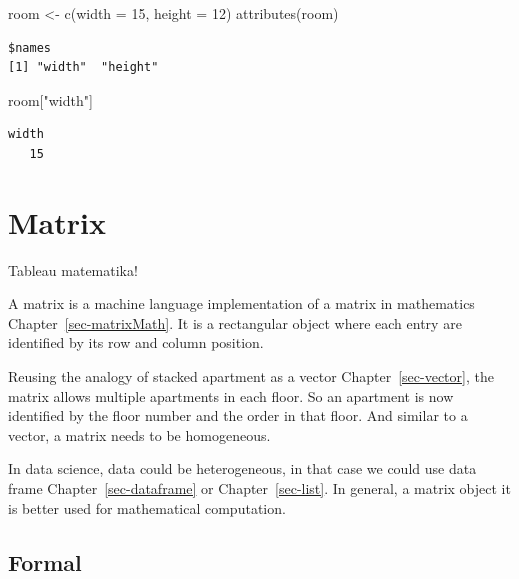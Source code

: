 \documentclass[
  letterpaper,
  DIV=11,
  numbers=noendperiod]{scrreprt}
\newenvironment{Shaded}{\begin{snugshade}}{\end{snugshade}}
\newcommand{\AttributeTok}[1]{\textcolor[rgb]{0.40,0.45,0.13}{#1}}
\newcommand{\DecValTok}[1]{\textcolor[rgb]{0.68,0.00,0.00}{#1}}
\newcommand{\FunctionTok}[1]{\textcolor[rgb]{0.28,0.35,0.67}{#1}}
\newcommand{\NormalTok}[1]{\textcolor[rgb]{0.00,0.23,0.31}{#1}}
\newcommand{\OtherTok}[1]{\textcolor[rgb]{0.00,0.23,0.31}{#1}}
\newcommand{\StringTok}[1]{\textcolor[rgb]{0.13,0.47,0.30}{#1}}
\begin{document}
\begin{Shaded}
\begin{Highlighting}[]
\NormalTok{room }\OtherTok{\textless{}{-}} \FunctionTok{c}\NormalTok{(}\AttributeTok{width =} \DecValTok{15}\NormalTok{, }\AttributeTok{height =} \DecValTok{12}\NormalTok{)}
\FunctionTok{attributes}\NormalTok{(room)}
\end{Highlighting}
\end{Shaded}

\begin{verbatim}
$names
[1] "width"  "height"
\end{verbatim}

\begin{Shaded}
\begin{Highlighting}[]
\NormalTok{room[}\StringTok{"width"}\NormalTok{]}
\end{Highlighting}
\end{Shaded}

\begin{verbatim}
width 
   15 
\end{verbatim}

\chapter{Matrix}\label{sec-matrixCoding}

Tableau matematika!

A matrix is a machine language implementation of a matrix in mathematics
Chapter~\ref{sec-matrixMath}. It is a rectangular object where each
entry are identified by its row and column position.

Reusing the analogy of stacked apartment as a vector
Chapter~\ref{sec-vector}, the matrix allows multiple apartments in each
floor. So an apartment is now identified by the floor number and the
order in that floor. And similar to a vector, a matrix needs to be
homogeneous.

In data science, data could be heterogeneous, in that case we could use
data frame Chapter~\ref{sec-dataframe} or Chapter~\ref{sec-list}. In
general, a matrix object it is better used for mathematical computation.

\section*{Formal}\label{formal-35}

\end{document}
